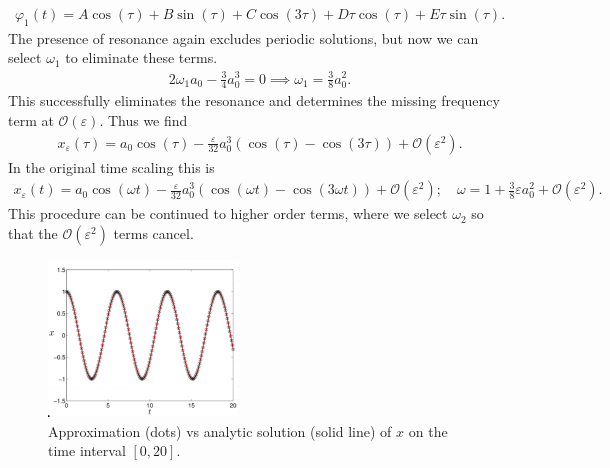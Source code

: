 \begin{ex}
\begin{align}
	\varphi_1(t) = A \cos(\tau) + B \sin(\tau) + C \cos(3\tau) + D\tau \cos(\tau) + E \tau \sin(\tau).
\end{align}
The presence of resonance again excludes periodic solutions, but now we can select $\omega_1$ to eliminate these terms.
\begin{align}
	2\omega_1 a_0 - \frac{3}{4} a_0 ^{3} = 0 \implies \boxed{\omega_1 = \frac{3}{8}a_0^{2}.}
\end{align}
This successfully eliminates the resonance and determines the missing frequency term at $\mathcal{O}(\varepsilon)$. Thus we find
\begin{align}
	x_\varepsilon(\tau) = a_0 \cos(\tau) - \frac{\varepsilon}{32}a_0^{3}\left( \cos(\tau) - \cos (3\tau) \right) + \mathcal{O}(\varepsilon^2).
\end{align}
In the original time scaling this is
\begin{align}
	x_\varepsilon (t) = a_0 \cos (\omega t) - \frac{\varepsilon}{32} a_0^3 \left( \cos(\omega t) - \cos(3\omega t)\right) + \mathcal{O}(\varepsilon^2); \quad \omega = 1+ \frac{3}{8}\varepsilon a_0^2 + \mathcal{O}(\varepsilon^2).	
\end{align}
This procedure can be continued to higher order terms, where we select $\omega_2$ so that the $\mathcal{O}(\varepsilon^2)$ terms cancel.
\begin{figure}[h!]
	\centering
	\includegraphics[width=0.45\textwidth]{figures/ch1/19approximation_accuracy.png}
	\caption{Approximation (dots) vs analytic solution (solid line) of $x$ on the time interval $[0,20]$.}
\end{figure}

\end{ex}
